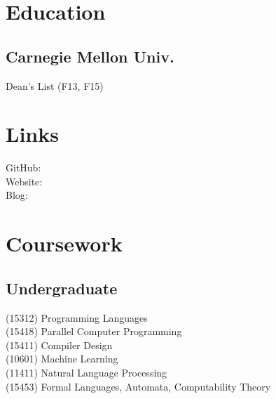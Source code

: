 \documentclass[]{deedy-resume-openfont}
\begin{document}
%
%

%
%



%
%

\begin{minipage}[t]{0.33\textwidth}


\section{Education}

\subsection{Carnegie Mellon Univ.}
Dean's List (F13, F15) \\
\sectionsep


\section{Links}
GitHub: \href{https://github.com/jez}{} \\
Website:  \href{https://jez.io}{} \\
Blog:  \href{http://blog.jez.io}{} \\
\sectionsep


\section{Coursework}
\subsection{Undergraduate}
(15312) Programming Languages\\
(15418) Parallel Computer Programming\\
(15411) Compiler Design\\
(10601) Machine Learning\\
(11411) Natural Language Processing\\
(15453) Formal Languages, Automata, Computability Theory\\
\sectionsep


\end{minipage}
\end{document}
